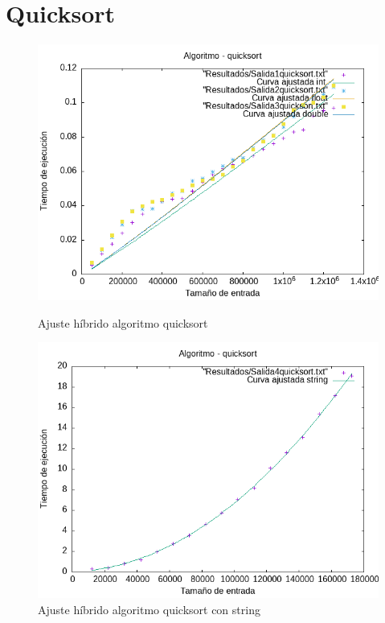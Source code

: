 \documentclass[11pt,openany]{book}
\begin{document}
\section*{Quicksort}
\begin{figure}[H]
    \begin{minipage}{0.5\textwidth}
        \centering
        \includegraphics[width=\linewidth]{assets/AjusteHibrido_latex/Hibridoquicksort/quicksort_hib.png}
        \caption{Ajuste híbrido algoritmo quicksort}
        \label{fig:quicksort}
    \end{minipage}%
    \begin{minipage}{0.5\textwidth}
        \centering
        \includegraphics[width=\linewidth]{assets/AjusteHibrido_latex/Hibridoquicksort/quicksortstring_hib.png}
        \caption{Ajuste híbrido algoritmo quicksort con string}
        \label{fig:quicksort}
    \end{minipage}
\end{figure}
\end{document}
